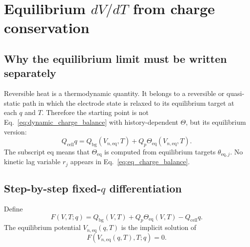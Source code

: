 \documentclass[11pt,a4paper]{article}
\newcommand{\eqs}{\mathrm{eq}}
\newcommand{\bg}{\mathrm{bg}}
\newcommand{\cell}{\mathrm{cell}}
\begin{document}
\section{Equilibrium \(dV/dT\) from charge conservation}\label{sec:eq_dvdt}

\subsection{Why the equilibrium limit must be written separately}\label{sec:eq_need}

Reversible heat is a thermodynamic quantity. It belongs to a reversible or quasi-static path in which the
electrode state is relaxed to its equilibrium target at each \(q\) and \(T\). Therefore the starting point is
not Eq.~\eqref{eq:dynamic_charge_balance} with history-dependent \(\Theta\), but its equilibrium version:
\begin{equation}
Q_{\cell}q
=
Q_{\bg}(V_{n,\eqs},T)
+Q_p\Theta_{\eqs}(V_{n,\eqs},T).
\label{eq:eq_charge_balance}
\end{equation}
The subscript \(\eqs\) means that \(\Theta_{\eqs}\) is computed from equilibrium targets
\(\theta_{\eqs,j}\). No kinetic lag variable \(r_j\) appears in Eq.~\eqref{eq:eq_charge_balance}.

\subsection{Step-by-step fixed-\(q\) differentiation}\label{sec:differentiate}

Define
\begin{equation}
F(V,T;q)
=
Q_{\bg}(V,T)+Q_p\Theta_{\eqs}(V,T)-Q_{\cell}q.
\label{eq:F_definition}
\end{equation}
The equilibrium potential \(V_{n,\eqs}(q,T)\) is the implicit solution of
\begin{equation}
F(V_{n,\eqs}(q,T),T;q)=0.
\label{eq:F_zero}
\end{equation}
\end{document}
